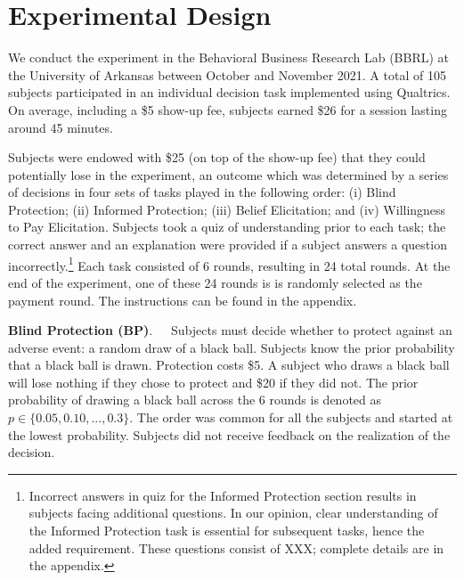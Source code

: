\documentclass[12pt,a4paper]{article}
\begin{document}
\section{Experimental Design}

We conduct the experiment in the Behavioral Business Research Lab (BBRL) at the University of Arkansas between October and November 2021.  A total of 105 subjects participated in an individual decision task implemented using Qualtrics.  On average, including a \$5 show-up fee, subjects earned \$26 for a session lasting around 45 minutes. 
 
Subjects were endowed with \$25 (on top of the show-up fee) that they could potentially lose in the experiment, an outcome which was determined by a series of decisions in four sets of tasks played in the following order: (i) Blind Protection; (ii) Informed Protection; (iii) Belief Elicitation; and (iv) Willingness to Pay Elicitation. Subjects took a quiz of understanding prior to each task; the correct answer and an explanation were provided if a subject answers a question incorrectly.\footnote{Incorrect answers in quiz for the Informed Protection section results in subjects facing additional questions. In our opinion, clear understanding of the Informed Protection task is essential for subsequent tasks, hence the added requirement.  These questions consist of XXX; complete details are in the appendix.} Each task consisted of 6 rounds, resulting in 24 total rounds. At the end of the experiment, one of these 24 rounds is is randomly selected as the payment round. The instructions can be found in the appendix.


\bigskip
\noindent\textbf{Blind Protection (BP)}.\ \ \ Subjects must decide whether to protect against an adverse event: a random draw of a black ball.  Subjects know the prior probability that a black ball is drawn. Protection costs \$5. A subject who draws a black ball will lose nothing if they chose to protect and \$20 if they did not. The prior probability of drawing a black ball across the 6 rounds is denoted as $p \in \{0.05,0.10,...,0.3\}$. The order was common for all the subjects and started at the lowest probability. Subjects did not receive feedback on the realization of the decision.
\end{document}
